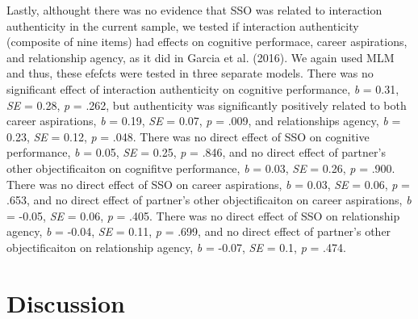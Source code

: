 \documentclass[man]{apa6}
\begin{document}
Lastly, althought there was no evidence that SSO was related to
interaction authenticity in the current sample, we tested if interaction
authenticity (composite of nine items) had effects on cognitive
performace, career aspirations, and relationship agency, as it did in
Garcia et al. (2016). We again used MLM and thus, these efefcts were
tested in three separate models. There was no significant effect of
interaction authenticity on cognitive performance, \emph{b} = 0.31,
\emph{SE} = 0.28, \emph{p} = .262, but authenticity was significantly
positively related to both career aspirations, \emph{b} = 0.19,
\emph{SE} = 0.07, \emph{p} = .009, and relationships agency, \emph{b} =
0.23, \emph{SE} = 0.12, \emph{p} = .048. There was no direct effect of
SSO on cognitive performance, \emph{b} = 0.05, \emph{SE} = 0.25,
\emph{p} = .846, and no direct effect of partner's other objectificaiton
on cognifitve performance, \emph{b} = 0.03, \emph{SE} = 0.26, \emph{p} =
.900. There was no direct effect of SSO on career aspirations, \emph{b}
= 0.03, \emph{SE} = 0.06, \emph{p} = .653, and no direct effect of
partner's other objectificaiton on career aspirations, \emph{b} = -0.05,
\emph{SE} = 0.06, \emph{p} = .405. There was no direct effect of SSO on
relationship agency, \emph{b} = -0.04, \emph{SE} = 0.11, \emph{p} =
.699, and no direct effect of partner's other objectificaiton on
relationship agency, \emph{b} = -0.07, \emph{SE} = 0.1, \emph{p} = .474.

\section{Discussion}\label{discussion}
\end{document}
